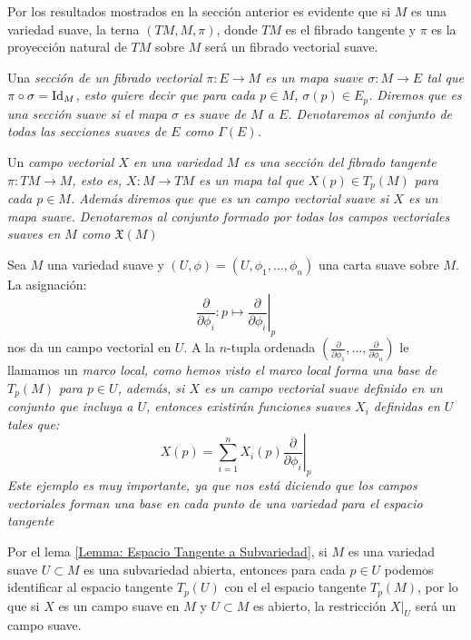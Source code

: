 Por los resultados mostrados en la sección anterior es evidente que si $M$ es una variedad suave, la terna $(TM, M, \pi)$, donde $TM$ es el fibrado tangente y $\pi$ es la proyección natural de $TM$ sobre $M$ será un fibrado vectorial suave.

\begin{definition}
  Una \it{sección} de un fibrado vectorial $\pi: E \to M$ es un mapa suave $\sigma: M \to E$ tal que $\pi \circ \sigma = \mathrm{Id}_{M}$, esto quiere decir que para cada $p \in M$, $\sigma(p) \in E_p$. Diremos que es una \it{sección suave} si el mapa $\sigma$ es suave de $M$ a $E$. Denotaremos al conjunto de todas las secciones suaves de $E$ como $\Gamma(E)$.
\end{definition}

\begin{definition}
  Un \it{campo vectorial} $X$ en una variedad $M$ es una sección del fibrado tangente $\pi: TM \to M$, esto es, $X: M \to TM$ es un mapa tal que $X(p) \in T_{p}(M)$ para cada $p \in M$. Además diremos que que es un \it{campo vectorial suave} si $X$ es un mapa suave. Denotaremos al conjunto formado por todas los campos vectoriales suaves en $M$ como $\mathfrak{X}(M)$
\end{definition}

\begin{example}
  Sea $M$ una variedad suave y $(U,\phi)=(U,\phi_1, \dots,\phi_n)$ una carta suave sobre $M$. La asignación:
  \[
    \frac{\partial}{\partial \phi_i}: p \mapsto \left. \frac{\partial}{\partial \phi_i}\right|_{p}
  \]
  nos da un campo vectorial en $U$. A la $n$-tupla ordenada $(\frac{\partial}{\partial \phi_1}, \dots, \frac{\partial}{\partial \phi_n})$ le llamamos un \it{marco local}, como hemos visto el marco local forma una base de $T_p(M)$ para $p \in U$, además, si $X$ es un campo vectorial suave definido en un conjunto que incluya a $U$, entonces existirán funciones suaves $X_i$ definidas en $U$ tales que:
\[
  X(p) = \sum_{i=1}^{n}X_i(p)\left.\frac{\partial}{\partial\phi_i} \right|_{p}
\]
Este ejemplo es muy importante, ya que nos está diciendo que los campos vectoriales forman una base en cada punto de una variedad para el espacio tangente 
\end{example}

Por el lema \ref{Lemma: Espacio Tangente a Subvariedad}, si $M$
 es una variedad suave $U \subset M$ es una subvariedad abierta, entonces para cada $p \in U$ podemos identificar al espacio tangente $T_p(U)$ con el el espacio tangente $T_p(M)$, por lo que si $X$ es un campo suave en $M$ y $U \subset M$ es abierto, la restricción $X|_{U}$ será un campo suave.

